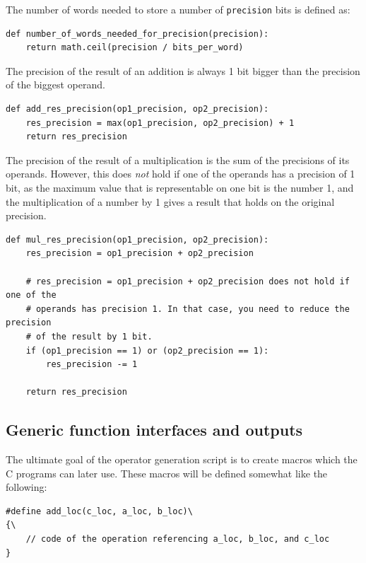 \documentclass[10pt, a4paper]{report}
\begin{document}
The number of words needed to store a number of \verb+precision+ bits is defined
as:

\begin{lstlisting}
def number_of_words_needed_for_precision(precision):
    return math.ceil(precision / bits_per_word)
\end{lstlisting}

The precision of the result of an addition is always 1 bit bigger than the
precision of the biggest operand.

\begin{lstlisting}
def add_res_precision(op1_precision, op2_precision):
    res_precision = max(op1_precision, op2_precision) + 1
    return res_precision
\end{lstlisting}

The precision of the result of a multiplication is the sum of the precisions of
its operands.
However, this does \emph{not} hold if one of the operands has a precision of 1
bit, as the maximum value that is representable on one bit is the number 1, and
the multiplication of a number by 1 gives a result that holds on the original
precision.

\begin{lstlisting}
def mul_res_precision(op1_precision, op2_precision):
    res_precision = op1_precision + op2_precision

    # res_precision = op1_precision + op2_precision does not hold if one of the
    # operands has precision 1. In that case, you need to reduce the precision
    # of the result by 1 bit.
    if (op1_precision == 1) or (op2_precision == 1):
        res_precision -= 1

    return res_precision
\end{lstlisting}

\subsection{Generic function interfaces and outputs}
The ultimate goal of the operator generation script is to create macros which
the C programs can later use. These macros will be defined somewhat like the
following:

\begin{lstlisting}
#define add_loc(c_loc, a_loc, b_loc)\
{\
    // code of the operation referencing a_loc, b_loc, and c_loc
}
\end{lstlisting}
\end{document}
